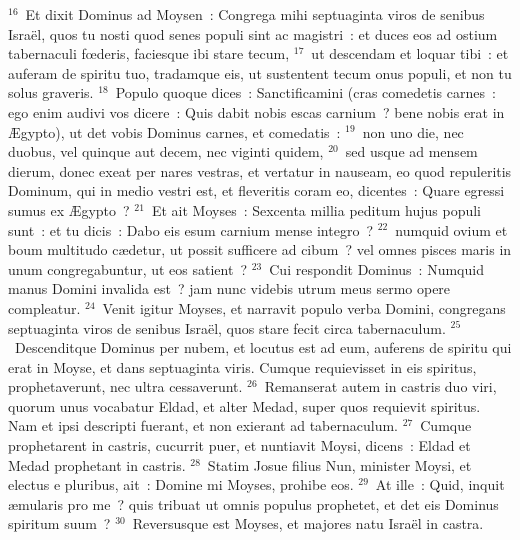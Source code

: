 ${}^{16}$~Et dixit Dominus ad Moysen~: Congrega mihi septuaginta viros de senibus Isra\"el, quos tu nosti quod senes populi sint ac magistri~: et duces eos ad ostium tabernaculi fœderis, faciesque ibi stare tecum,
${}^{17}$~ut descendam et loquar tibi~: et auferam de spiritu tuo, tradamque eis, ut sustentent tecum onus populi, et non tu solus graveris.
${}^{18}$~Populo quoque dices~: Sanctificamini (cras comedetis carnes~: ego enim audivi vos dicere~: Quis dabit nobis escas carnium~? bene nobis erat in \AE gypto), ut det vobis Dominus carnes, et comedatis~:
${}^{19}$~non uno die, nec duobus, vel quinque aut decem, nec viginti quidem,
${}^{20}$~sed usque ad mensem dierum, donec exeat per nares vestras, et vertatur in nauseam, eo quod repuleritis Dominum, qui in medio vestri est, et fleveritis coram eo, dicentes~: Quare egressi sumus ex \AE gypto~?
${}^{21}$~Et ait Moyses~: Sexcenta millia peditum hujus populi sunt~: et tu dicis~: Dabo eis esum carnium mense integro~?
${}^{22}$~numquid ovium et boum multitudo c\ae detur, ut possit sufficere ad cibum~? vel omnes pisces maris in unum congregabuntur, ut eos satient~?
${}^{23}$~Cui respondit Dominus~: Numquid manus Domini invalida est~? jam nunc videbis utrum meus sermo opere compleatur.
${}^{24}$~Venit igitur Moyses, et narravit populo verba Domini, congregans septuaginta viros de senibus Isra\"el, quos stare fecit circa tabernaculum.
${}^{25}$~Descenditque Dominus per nubem, et locutus est ad eum, auferens de spiritu qui erat in Moyse, et dans septuaginta viris. Cumque requievisset in eis spiritus, prophetaverunt, nec ultra cessaverunt.
${}^{26}$~Remanserat autem in castris duo viri, quorum unus vocabatur Eldad, et alter Medad, super quos requievit spiritus. Nam et ipsi descripti fuerant, et non exierant ad tabernaculum.
${}^{27}$~Cumque prophetarent in castris, cucurrit puer, et nuntiavit Moysi, dicens~: Eldad et Medad prophetant in castris.
${}^{28}$~Statim Josue filius Nun, minister Moysi, et electus e pluribus, ait~: Domine mi Moyses, prohibe eos.
${}^{29}$~At ille~: Quid, inquit \ae mularis pro me~? quis tribuat ut omnis populus prophetet, et det eis Dominus spiritum suum~?
${}^{30}$~Reversusque est Moyses, et majores natu Isra\"el in castra.


